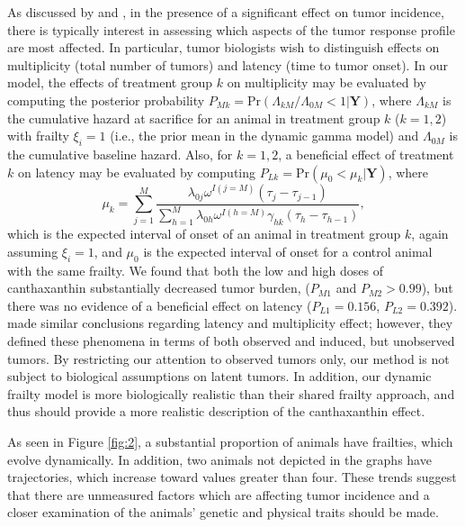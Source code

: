 \documentclass[10pt, letterpaper]{article}
\begin{document}
As discussed by \citet{Kokoska1993} and \citet{Dunson2000b}, in the presence of a significant effect on tumor incidence, there is typically interest in assessing which aspects of the tumor response profile are most affected. In particular, tumor biologists wish to distinguish effects on multiplicity (total number of tumors) and latency (time to tumor onset). In our model, the effects of treatment group $k$ on multiplicity may be evaluated by computing the posterior probability $P_{Mk} = \text{Pr}(\Lambda_{kM} / \Lambda_{0M} < 1 | \mathbf{Y})$, where $\Lambda_{kM}$ is the cumulative hazard at sacrifice for an animal in treatment group $k$ ($k=1, 2$) with frailty $\xi_i = 1$ (i.e., the prior mean in the dynamic gamma model) and $\Lambda_{0M}$ is the cumulative baseline hazard. Also, for $k=1, 2$, a beneficial effect of treatment $k$ on latency may be evaluated by computing $P_{Lk} = \text{Pr}(\mu_0 < \mu_k | \mathbf{Y})$, where
\begin{equation} \label{eq:10}
\mu_k = \sum_{j=1}^{M} \frac{\lambda_{0j} \omega^{I(j=M)} (\tau_j - \tau_{j-1})}{\sum_{h=1}^{M} \lambda_{0h} \omega^{I(h=M)} \gamma_{hk} (\tau_h - \tau_{h-1})},
\end{equation}
which is the expected interval of onset of an animal in treatment group $k$, again assuming $\xi_i=1$, and $\mu_0$ is the expected interval of onset for a control animal with the same frailty. We found that both the low and high doses of canthaxanthin substantially decreased tumor burden, ($P_{M1}$ and $P_{M2} > 0.99$), but there was no evidence of a beneficial effect on latency ($P_{L1} = 0.156$, $P_{L2} = 0.392$). \citet{Dunson2000b} made similar conclusions regarding latency and multiplicity effect; however, they defined these phenomena in terms of both observed and induced, but unobserved tumors. By restricting our attention to observed tumors only, our method is not subject to biological assumptions on latent tumors. In addition, our dynamic frailty model is more biologically realistic than their shared frailty approach, and thus should provide a more realistic description of the canthaxanthin effect.

As seen in Figure \ref{fig:2}, a substantial proportion of animals have frailties, which evolve dynamically. In addition, two animals not depicted in the graphs have trajectories, which increase toward values greater than four. These trends suggest that there are unmeasured factors which are affecting tumor incidence and a closer examination of the animals' genetic and physical traits should be made.
\end{document}
